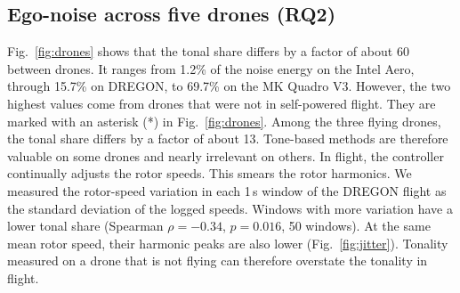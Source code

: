 \documentclass{svproc}
\begin{document}
\subsection{Ego-noise across five drones (RQ2)}
Fig.~\ref{fig:drones} shows that the tonal share differs by a factor of about 60 between drones. It ranges from 1.2\% of the noise energy on the Intel Aero, through 15.7\% on DREGON, to 69.7\% on the MK Quadro V3.
However, the two highest values come from drones that were not in self-powered flight.
They are marked with an asterisk (*) in Fig.~\ref{fig:drones}.
Among the three flying drones, the tonal share differs by a factor of about 13.
Tone-based methods are therefore valuable on some drones and nearly irrelevant on others.
In flight, the controller continually adjusts the rotor speeds.
This smears the rotor harmonics.
We measured the rotor-speed variation in each 1\,s window of the DREGON flight as the standard deviation of the logged speeds.
Windows with more variation have a lower tonal share (Spearman $\rho=-0.34$, $p=0.016$, 50 windows).
At the same mean rotor speed, their harmonic peaks are also lower (Fig.~\ref{fig:jitter}).
Tonality measured on a drone that is not flying can therefore overstate the tonality in flight.
\end{document}
